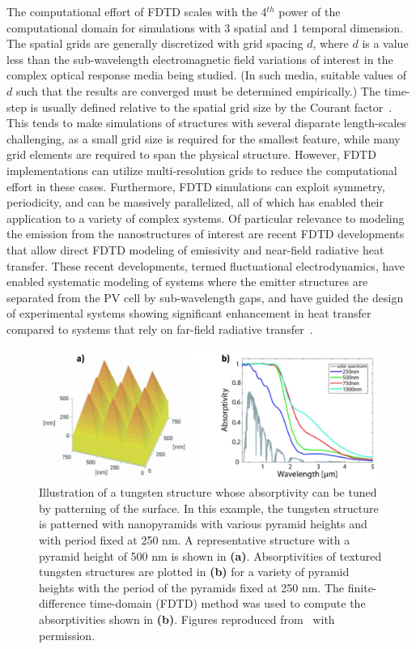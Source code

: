 \documentclass[review]{elsarticle}
\begin{document}
The computational effort of FDTD scales with the 4$^{th}$ power of the computational domain for 
simulations with 3 spatial and 1 temporal dimension.
The spatial grids are generally discretized with grid spacing $d$, where $d$ is a value less
than the sub-wavelength electromagnetic field variations of interest in the complex
optical response media being studied. (In such media, suitable values of $d$ 
such that the results are converged must
be determined empirically.)
The time-step is usually defined relative to the spatial grid size by the Courant 
factor~\cite{Taflove_FDTD}.   This tends to make simulations of structures with several disparate length-scales challenging, as a small
grid size is required for the smallest feature, while many grid elements are required to span the physical structure.  However, FDTD 
implementations can utilize multi-resolution grids to reduce the computational effort in these cases.  Furthermore, FDTD simulations 
can exploit symmetry, periodicity, and can be massively parallelized, all of which has enabled their application to a variety of complex systems.
Of particular relevance to modeling the emission from the nanostructures of interest are recent
FDTD developments that allow direct FDTD modeling of emissivity and near-field radiative heat transfer\cite{rodriguez2011,datas2013,didari2014,didari2015}.  These recent developments, termed fluctuational electrodynamics,
have enabled systematic modeling of systems where the emitter structures are separated from the PV cell by sub-wavelength gaps, and
have guided the design of experimental systems showing significant enhancement in heat transfer compared to systems that 
rely on far-field radiative transfer~\cite{SZF_NatNano_2016}.


\begin{figure}[ht!]
        \includegraphics[width=\textwidth]{FDTD_Modeling}
        \caption{\label{FDTD_Structures}  Illustration of a tungsten structure whose
absorptivity can be tuned by patterning of the surface.  In this example, the tungsten
structure is patterned with nanopyramids with various pyramid heights and with period fixed
at  250 nm.  A representative structure with a pyramid height of 500 nm is shown in {\bf (a)}.
Absorptivities of textured tungsten structures
are plotted in {\bf (b)} for a variety of pyramid heights with the period of the pyramids
fixed at 250 nm.  The finite-difference time-domain (FDTD) method
was used to compute the absorptivities shown in {\bf (b)}.  
Figures reproduced from~\cite{RF_OptExp_2009} with permission.}
\end{figure}
\end{document}
